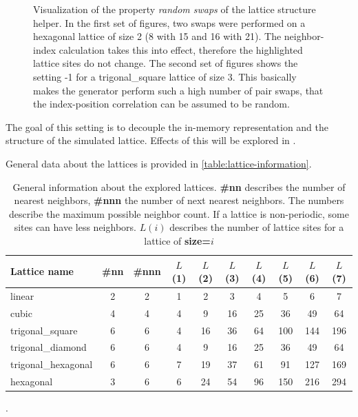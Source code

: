 \begin{figure}[htbp]
    \vspace{0.2cm}
    \caption{Visualization of the property \emph{random swaps} of the lattice structure helper. In the first set of figures, two swaps were performed on a hexagonal lattice of size 2 (8 with 15 and 16 with 21). The neighbor-index calculation takes this into effect, therefore the highlighted lattice sites do not change. The second set of figures shows the setting -1 for a trigonal\_square lattice of size 3. This basically makes the generator perform such a high number of pair swaps, that the index-position correlation can be assumed to be random. 
    }
    \label{fig:direct-comparison-lattice-site-swaps}
\end{figure}

The goal of this setting is to decouple the in-memory representation and the structure of the simulated lattice. 
Effects of this will be explored in .

General data about the lattices is provided in \autoref{table:lattice-information}.

\begin{table}[htbp]
    \centering
    \begin{tabular}{l|cc|ccccccc} 
        \toprule
        Lattice name & \#nn & \#nnn &$L$(1)&$L$(2)&$L$(3)&$L$(4)&$L$(5)&$L$(6)&$L$(7)\\  
        \midrule 
        linear & 2 & 2 & 1 & 2 & 3 & 4 & 5 & 6 & 7\\
        cubic & 4 & 4 & 4 & 9 & 16 & 25 & 36 & 49 & 64\\
        trigonal\_square & 6 & 6 & 4 & 16 & 36 & 64 & 100 & 144 & 196\\
        trigonal\_diamond & 6 & 6 & 4 & 9 & 16 & 25 & 36 & 49 & 64\\
        trigonal\_hexagonal & 6 & 6 & 7 & 19 & 37 & 61 & 91 & 127 & 169\\
        hexagonal & 3 & 6 & 6 & 24 & 54 & 96 & 150 & 216 & 294\\
        \bottomrule
    \end{tabular}
    \vspace{0.5cm}
    \caption{General information about the explored lattices. \textbf{\#nn} describes the number of nearest neighbors, \textbf{\#nnn} the number of next nearest neighbors. The numbers describe the maximum possible neighbor count. If a lattice is non-periodic, some sites can have less neighbors. $L(i)$ describes the number of lattice sites for a lattice of \textbf{size=$i$}}.
    \label{table:lattice-information}
\end{table}




